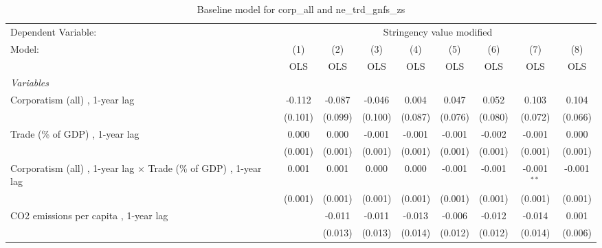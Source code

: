 
\begin{table}[htbp]
   \caption{Baseline model for corp\_all and ne\_trd\_gnfs\_zs}
   \centering
   \begin{tabular}{lcccccccc}
      \toprule
      Dependent Variable: & \multicolumn{8}{c}{Stringency value modified}\\
      Model:                                                                   & (1)     & (2)     & (3)          & (4)          & (5)           & (6)           & (7)           & (8)\\  
                                                                               &  OLS    & OLS     & OLS          & OLS          & OLS           & OLS           & OLS           & OLS\\  
      \midrule
      \emph{Variables}\\
      Corporatism (all) , 1-year lag                                           & -0.112  & -0.087  & -0.046       & 0.004        & 0.047         & 0.052         & 0.103         & 0.104\\   
                                                                               & (0.101) & (0.099) & (0.100)      & (0.087)      & (0.076)       & (0.080)       & (0.072)       & (0.066)\\   
      Trade (\% of GDP) , 1-year lag                                           & 0.000   & 0.000   & -0.001       & -0.001       & -0.001        & -0.002        & -0.001        & 0.000\\   
                                                                               & (0.001) & (0.001) & (0.001)      & (0.001)      & (0.001)       & (0.001)       & (0.001)       & (0.001)\\   
      Corporatism (all) , 1-year lag $\times$ Trade (\% of GDP) , 1-year lag   & 0.001   & 0.001   & 0.000        & 0.000        & -0.001        & -0.001        & -0.001$^{**}$ & -0.001\\   
                                                                               & (0.001) & (0.001) & (0.001)      & (0.001)      & (0.001)       & (0.001)       & (0.001)       & (0.001)\\   
      CO2 emissions per capita , 1-year lag                                    &         & -0.011  & -0.011       & -0.013       & -0.006        & -0.012        & -0.014        & 0.001\\   
                                                                               &         & (0.013) & (0.013)      & (0.014)      & (0.012)       & (0.012)       & (0.014)       & (0.006)\\   

\end{tabular}
\end{table}
